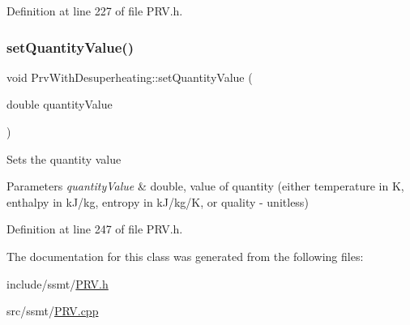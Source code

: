 Definition at line 227 of file P\+R\+V.\+h.

\mbox{\label{class_prv_with_desuperheating_a9960e4be45699f09e65035832fff792a}} 
\subsubsection{\texorpdfstring{set\+Quantity\+Value()}{setQuantityValue()}}
{\footnotesize\ttfamily void Prv\+With\+Desuperheating\+::set\+Quantity\+Value (\begin{DoxyParamCaption}\item[{double}]{quantity\+Value }\end{DoxyParamCaption})\hspace{0.3cm}{\ttfamily [inline]}}

Sets the quantity value


\begin{DoxyParams}{Parameters}
{\em quantity\+Value} & double, value of quantity (either temperature in K, enthalpy in k\+J/kg, entropy in k\+J/kg/K, or quality -\/ unitless) \\
\hline
\end{DoxyParams}


Definition at line 247 of file P\+R\+V.\+h.



The documentation for this class was generated from the following files\+:\begin{DoxyCompactItemize}
\item 
include/ssmt/\hyperlink{_p_r_v_8h}{P\+R\+V.\+h}\item 
src/ssmt/\hyperlink{_p_r_v_8cpp}{P\+R\+V.\+cpp}\end{DoxyCompactItemize}
